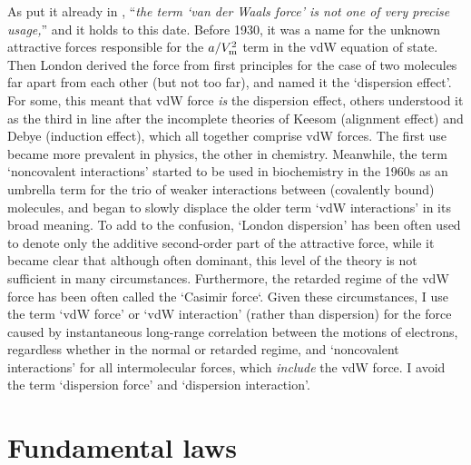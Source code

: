 As \citeauthor{MargenauRMP39} put it already in \citeyear{MargenauRMP39}, ``\emph{the term `van der Waals force' is not one of very precise usage,}'' and it holds to this date.
Before 1930, it was a name for the unknown attractive forces responsible for the $a/V_\text m^2$ term in the vdW equation of state.
Then London derived the force from first principles for the case of two molecules far apart from each other (but not too far), and named it the `dispersion effect'.
For some, this meant that vdW force \emph{is} the dispersion effect, others understood it as the third in line after the incomplete theories of Keesom (alignment effect) and Debye (induction effect), which all together comprise vdW forces.
The first use became more prevalent in physics, the other in chemistry.
Meanwhile, the term `noncovalent interactions' started to be used in biochemistry in the 1960s as an umbrella term for the trio of weaker interactions between (covalently bound) molecules, and began to slowly displace the older term `vdW interactions' in its broad meaning.
To add to the confusion, `London dispersion' has been often used to denote only the additive second-order part of the attractive force, while it became clear that although often dominant, this level of the theory is not sufficient in many circumstances.
Furthermore, the retarded regime of the vdW force has been often called the `Casimir force`.
Given these circumstances, I use the term `vdW force' or `vdW interaction' (rather than dispersion) for the force caused by instantaneous long-range correlation between the motions of electrons, regardless whether in the normal or retarded regime, and `noncovalent interactions' for all intermolecular forces, which \emph{include} the vdW force.
I avoid the term `dispersion force' and `dispersion interaction'.

\section{Fundamental laws}

